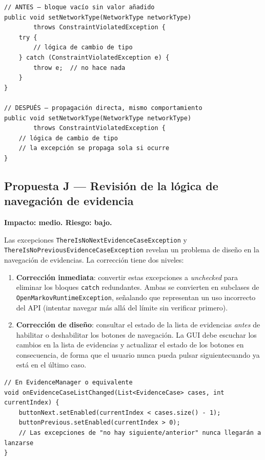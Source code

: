 \documentclass[11pt,a4paper]{article}
\begin{document}
\begin{lstlisting}[caption={Eliminación del bloque \texttt{try/catch} vacío en \texttt{ProbNet.java}},label={lst:probnet-fix}]
// ANTES — bloque vacío sin valor añadido
public void setNetworkType(NetworkType networkType)
        throws ConstraintViolatedException {
    try {
        // lógica de cambio de tipo
    } catch (ConstraintViolatedException e) {
        throw e;  // no hace nada
    }
}

// DESPUÉS — propagación directa, mismo comportamiento
public void setNetworkType(NetworkType networkType)
        throws ConstraintViolatedException {
    // lógica de cambio de tipo
    // la excepción se propaga sola si ocurre
}
\end{lstlisting}

\subsection{Propuesta J — Revisión de la lógica de navegación de evidencia}

\textbf{Impacto: medio. Riesgo: bajo.}

Las excepciones \texttt{ThereIsNoNext\-Evidence\-Case\-Exception} y
\texttt{ThereIsNoPrevious\-Evidence\-Case\-Exception} revelan un problema de diseño en la
navegación de evidencias. La corrección tiene dos niveles:

\begin{enumerate}
    \item \textbf{Corrección inmediata}: convertir estas excepciones a \textit{unchecked}
          para eliminar los bloques \texttt{catch} redundantes. Ambas se convierten en subclases
          de \texttt{OpenMarkovRuntimeException}, señalando que representan un uso incorrecto del
          API (intentar navegar más allá del límite sin verificar primero).

    \item \textbf{Corrección de diseño}: consultar el estado de la lista de evidencias
          \emph{antes} de habilitar o deshabilitar los botones de navegación. La GUI debe
          escuchar los cambios en la lista de evidencias y actualizar el estado de los botones
          en consecuencia, de forma que el usuario nunca pueda pulsar \guillemotleft siguiente\guillemotright  cuando ya
          está en el último caso.
\end{enumerate}

\begin{lstlisting}[caption={Enfoque preventivo para los botones de navegación de evidencia},label={lst:evidence-fix}]
// En EvidenceManager o equivalente
void onEvidenceCaseListChanged(List<EvidenceCase> cases, int currentIndex) {
    buttonNext.setEnabled(currentIndex < cases.size() - 1);
    buttonPrevious.setEnabled(currentIndex > 0);
    // Las excepciones de "no hay siguiente/anterior" nunca llegarán a lanzarse
}
\end{lstlisting}
\end{document}
